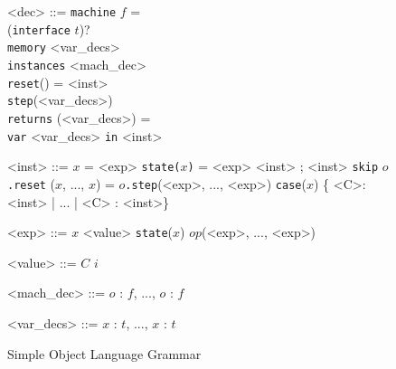 \begin{figure}[!h]
\begin{grammar}
<dec> ::= \verb|machine| $f$ = \\
(\verb|interface| $t$)? \\
\verb|memory| <var_decs> \\
\verb|instances| <mach_dec> \\
\verb|reset|() = <inst> \\
\verb|step|(<var_decs>) \\
\verb|returns| (<var_decs>) = \\
\verb|var| <var_decs> \verb|in| <inst>

<inst> ::= $x$ = <exp>
\alt \verb|state(|$x$\verb|)| = <exp>
\alt <inst> ; <inst>
\alt \verb|skip|
\alt $o$\verb|.reset|
\alt ($x$, ..., $x$) = $o$\verb|.step|(<exp>, ..., <exp>)
\alt \verb|case|($x$) \{ <C>: <inst> | ... | <C> : <inst>\}

<exp> ::= $x$
\alt <value>
\alt \verb|state|($x$)
\alt $op$(<exp>, ..., <exp>)

<value> ::= $C$ \alt $i$

<mach_dec> ::= $o$ : $f$, ..., $o$ : $f$

<var_decs> ::= $x$ : $t$, ..., $x$ : $t$

\end{grammar}
\hrulefill
\caption{Simple Object Language Grammar}
\label{SolGrammar}
\end{figure}